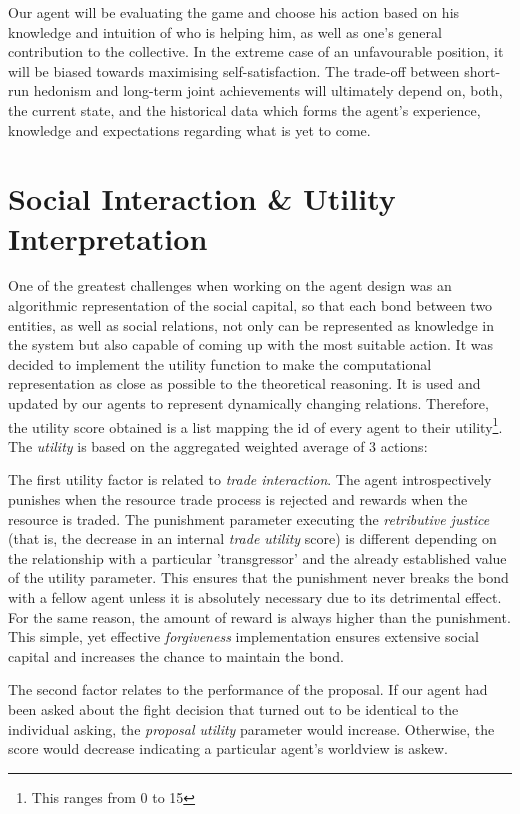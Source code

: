         Our agent will be evaluating the game and choose his action based on his knowledge and intuition of who is helping him, as well as one's general contribution to the collective. In the extreme case of an unfavourable position, it will be biased towards maximising self-satisfaction. The trade-off between short-run hedonism and long-term joint achievements will ultimately depend on, both, the current state, and the historical data which forms the agent's experience, knowledge and expectations regarding what is yet to come. 

\section{Social Interaction \& Utility Interpretation}

One of the greatest challenges when working on the agent design was an algorithmic representation of the social capital, so that each bond between two entities, as well as social relations, not only can be represented as knowledge in the system but also capable of coming up with the most suitable action. It was decided to implement the utility function to make the computational representation as close as possible to the theoretical reasoning. It is used and updated by our agents to represent dynamically changing relations. Therefore, the utility score obtained is a list mapping the id of every agent to their utility\footnote{This ranges from 0 to 15}. The \textit{utility} is based on the aggregated weighted average of 3 actions:
        
The first utility factor is related to \textit{trade interaction}. The agent introspectively punishes when the resource trade process is rejected and rewards when the resource is traded.
The punishment parameter executing the \textit{retributive justice} (that is, the decrease in an internal \textit{trade utility} score) is different depending on the relationship with a particular 'transgressor' and the already established value of the utility parameter. This ensures that the punishment never breaks the bond with a fellow agent unless it is absolutely necessary due to its detrimental effect. For the same reason, the amount of reward is always higher than the punishment. This simple, yet effective \textit{forgiveness} implementation ensures extensive social capital and increases the chance to maintain the bond.

The second factor relates to the performance of the proposal. If our agent had been asked about the fight decision that turned out to be identical to the individual asking, the \textit{proposal utility} parameter would increase. Otherwise, the score would decrease indicating a particular agent's worldview is askew. 

